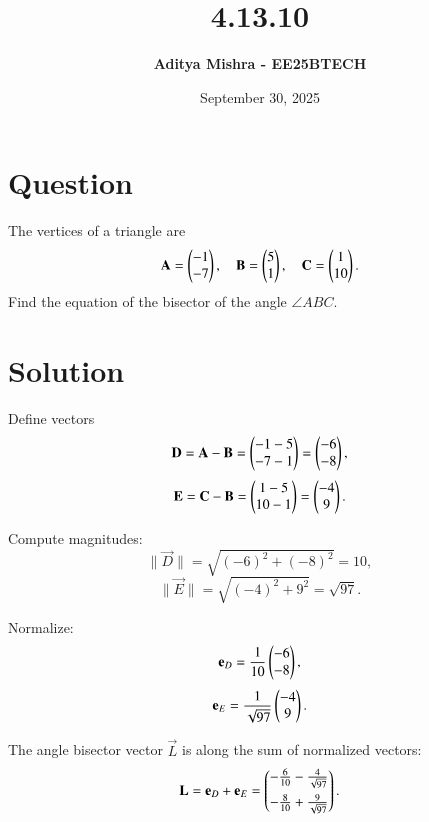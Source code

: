 \documentclass[12pt]{article}
\title{\textbf{4.13.10}}
\author{\textbf{Aditya Mishra - EE25BTECH}}
\date{September 30, 2025}
\begin{document}
\maketitle

\section*{Question}

The vertices of a triangle are 
\[
\mathbf{A} = \begin{pmatrix}-1 \\ -7\end{pmatrix}, \quad 
\mathbf{B} = \begin{pmatrix}5 \\ 1\end{pmatrix}, \quad 
\mathbf{C} = \begin{pmatrix}1 \\ 10\end{pmatrix}.
\]
Find the equation of the bisector of the angle \(\angle ABC\).

\section*{Solution}

Define vectors  
\begin{equation}
\mathbf{D} = \mathbf{A} - \mathbf{B} = \begin{pmatrix}-1 - 5 \\-7 - 1\end{pmatrix} = \begin{pmatrix}-6 \\ -8\end{pmatrix},
\end{equation}
\begin{equation}
\mathbf{E} = \mathbf{C} - \mathbf{B} = \begin{pmatrix}1 - 5 \\ 10 - 1\end{pmatrix} = \begin{pmatrix}-4 \\ 9\end{pmatrix}.
\end{equation}

Compute magnitudes:
\begin{equation}
\|\vec{D}\| = \sqrt{(-6)^2 + (-8)^2} = 10,
\end{equation}
\begin{equation}
\|\vec{E}\| = \sqrt{(-4)^2 + 9^2} = \sqrt{97}.
\end{equation}

Normalize:
\begin{equation}
\mathbf{e}_{D} = \frac{1}{10} \begin{pmatrix}-6 \\ -8\end{pmatrix},
\end{equation}
\begin{equation}
\mathbf{e}_{E} = \frac{1}{\sqrt{97}} \begin{pmatrix}-4 \\ 9\end{pmatrix}.
\end{equation}

The angle bisector vector \(\vec{L}\) is along the sum of normalized vectors:
\begin{equation}
\mathbf{L} = \mathbf{e}_{D} + \mathbf{e}_{E} 
= \begin{pmatrix}-\frac{6}{10} - \frac{4}{\sqrt{97}} \\[6pt]
       -\frac{8}{10} + \frac{9}{\sqrt{97}}\end{pmatrix}.
\end{equation}
\end{document}
